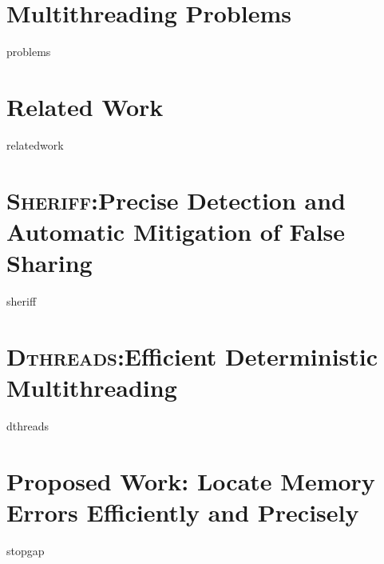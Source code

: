 \documentclass[proposal]{umthesis}          %
\newcommand{\dthreads}{{\scshape Dthreads}}
\newcommand{\sheriff}{{\scshape Sheriff}}
\begin{document}


\tableofcontents                %
\listoffigures                  %


\mainmatter   %



\chapter{Multithreading Problems}
 {problems}

\chapter{Related Work}
 {relatedwork}

\chapter{\sheriff{}:Precise Detection and Automatic Mitigation of False Sharing}
 {sheriff}

\chapter{\dthreads{}:Efficient Deterministic Multithreading}
 {dthreads}

\chapter{Proposed Work: Locate Memory Errors Efficiently and Precisely}
 {stopgap}

\backmatter  %




\end{document}
